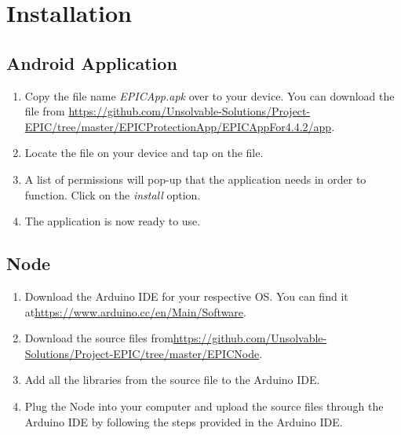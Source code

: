 \documentclass[a4paper,12pt,titlepage]{article}
\begin{document}
\newpage
\section{Installation}

\subsection{Android Application}
\begin{enumerate}
\item Copy the file name \textit{EPICApp.apk} over to your device. You can download the file from \url{https://github.com/Unsolvable-Solutions/Project-EPIC/tree/master/EPICProtectionApp/EPICAppFor4.4.2/app}.
\item Locate the file on your device and tap on the file.
\item A list of permissions will pop-up that the application needs in order to function. Click on the \textit{install} option.
\item The application is now ready to use.
\end{enumerate}

\subsection{Node}
\begin{enumerate}
\item Download the Arduino IDE for your respective OS. You can find it at\newline \url{https://www.arduino.cc/en/Main/Software}.
\item Download the source files from\newline \url{https://github.com/Unsolvable-Solutions/Project-EPIC/tree/master/EPICNode}.
\item Add all the libraries from the source file to the Arduino IDE.
\item Plug the Node into your computer and upload the source files through the Arduino IDE by following the steps provided in the Arduino IDE.
\end{enumerate}
\end{document}
